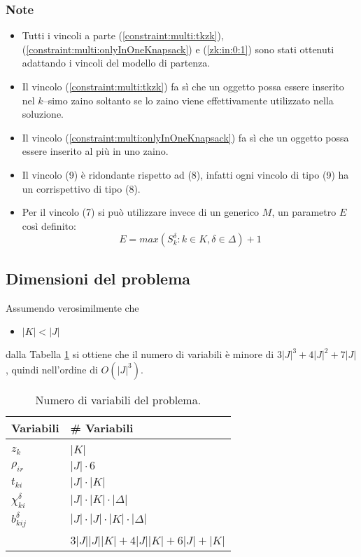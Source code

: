 \subsubsection{Note}
\begin{itemize}
\item Tutti i vincoli a parte (\ref{constraint:multi:tkzk}), 
(\ref{constraint:multi:onlyInOneKnapsack}) e (\ref{zk:in:0:1}) sono stati 
ottenuti adattando i vincoli del modello di partenza.
\item Il vincolo (\ref{constraint:multi:tkzk}) fa sì che un oggetto possa essere
 inserito nel $k$--simo zaino soltanto se lo zaino viene effettivamente 
 utilizzato nella soluzione.
\item Il vincolo (\ref{constraint:multi:onlyInOneKnapsack}) fa sì che un oggetto
possa essere inserito al più in uno zaino. 
\item Il vincolo (9) è ridondante rispetto ad (8), infatti ogni vincolo di tipo
(9) ha un corrispettivo di tipo (8).
\item Per il vincolo (7) si può utilizzare invece di un generico $M$, un 
parametro $E$ così definito:
$$
E = max(S_k^\delta : k \in K, \delta \in \Delta) + 1
$$ 
\end{itemize}


\subsection{Dimensioni del problema}
\label{sec:orig:dimensioneDelProblema}
Assumendo verosimilmente che 
\begin{itemize}
	\item $|K| < |J|$
\end{itemize}  
dalla Tabella \ref{table:no:variables}
si ottiene che il numero di variabili è minore di $3|J|^3 + 4|J|^2 + 7|J|$, 
quindi nell'ordine di $O(|J|^3)$.



\begin{table}[h!]
	\center
	\begin{tabular}{|l|l|}
		\hline
		Variabili & \# Variabili \\
		\hline
		& \\
		$z_k$ & $|K|$ \\
		$\rho_{ir}$ & $|J| \cdot 6$\\
		$t_{ki}$ & $|J| \cdot |K|$ \\
		$\chi_{ki}^\delta$ & $|J| \cdot |K| \cdot | \Delta |$\\
		$b_{kij}^\delta$ & $|J| \cdot |J| \cdot |K| \cdot |\Delta|$\\ 
		& \\
		\hline
		& $3|J||J||K| + 4|J||K|+6|J|+ |K|$ \\
		\hline
	\end{tabular}
	\caption{Numero di variabili del problema.}
	\label{table:no:variables}
\end{table}


